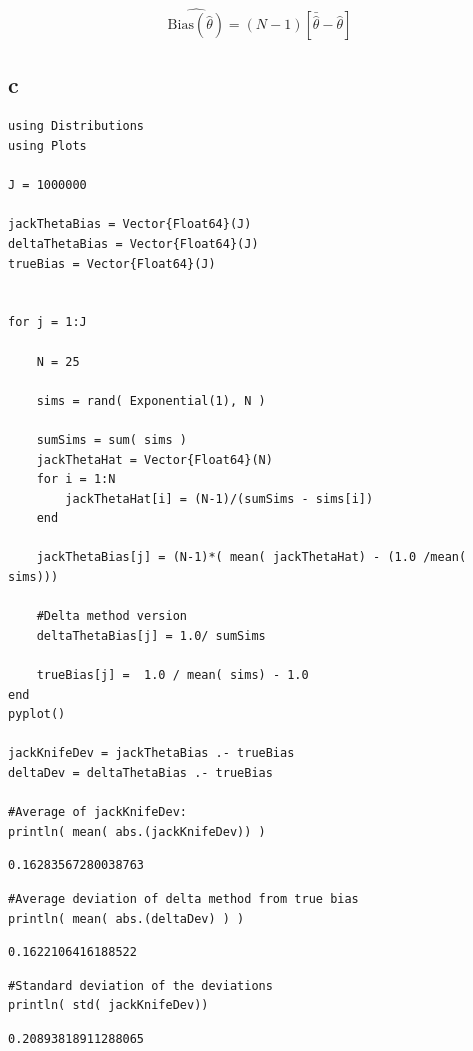 \documentclass[11pt]{article}
\begin{document}
$$\widehat{ \text{Bias}( \hat{\theta} ) } = (N-1)[ \bar{ \hat{ \theta } } - \hat{ \theta } ]$$

\subsection{c}
\label{sec-1-3}

\begin{verbatim}
using Distributions
using Plots

J = 1000000

jackThetaBias = Vector{Float64}(J)
deltaThetaBias = Vector{Float64}(J)
trueBias = Vector{Float64}(J)


for j = 1:J

    N = 25

    sims = rand( Exponential(1), N )

    sumSims = sum( sims )
    jackThetaHat = Vector{Float64}(N)
    for i = 1:N
        jackThetaHat[i] = (N-1)/(sumSims - sims[i])
    end

    jackThetaBias[j] = (N-1)*( mean( jackThetaHat) - (1.0 /mean( sims)))

    #Delta method version
    deltaThetaBias[j] = 1.0/ sumSims

    trueBias[j] =  1.0 / mean( sims) - 1.0
end
pyplot()

jackKnifeDev = jackThetaBias .- trueBias
deltaDev = deltaThetaBias .- trueBias

#Average of jackKnifeDev:
println( mean( abs.(jackKnifeDev)) )
\end{verbatim}
\begin{verbatim}
0.16283567280038763
\end{verbatim}

\begin{verbatim}
#Average deviation of delta method from true bias
println( mean( abs.(deltaDev) ) )
\end{verbatim}
\begin{verbatim}
0.1622106416188522
\end{verbatim}

\begin{verbatim}
#Standard deviation of the deviations
println( std( jackKnifeDev))
\end{verbatim}
\begin{verbatim}
0.20893818911288065
\end{verbatim}
\end{document}
